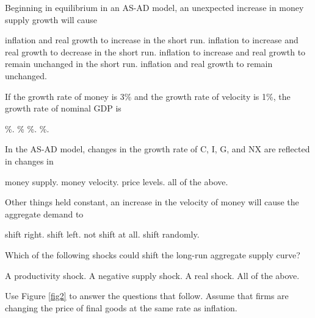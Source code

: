 \documentclass[addpoints,11pt]{exam}
\theoremstyle{definition}
\begin{document}
\begin{questions}
\question  Beginning in equilibrium in an AS-AD model, an unexpected increase in money supply growth will cause

\begin{choices}
	\CorrectChoice inflation and real growth to increase in the short run.
	\choice inflation to increase and real growth to decrease in the short run.
	\choice inflation to increase and real growth to remain unchanged in the short run.
	\choice inflation and real growth to remain unchanged.
\end{choices}

\question If the growth rate of money is 3\% and the growth rate of velocity is 1\%, the growth rate of nominal GDP is 

\begin{choices}
	\%.
	\%
	\%.
	\%.
\end{choices}

\question In the AS-AD model, changes in the growth rate of C, I, G, and NX are reflected in changes in 

\begin{choices}
	\choice money supply.
	\CorrectChoice money velocity.
	\choice price levels.
	\choice all of the above.
\end{choices}

\question Other things held constant, an increase in the velocity of money will cause the aggregate demand to 

\begin{choices}
	\CorrectChoice shift right.
	\choice shift left.
	\choice not shift at all.
	\choice shift randomly.
\end{choices}

\newpage

\question Which of the following shocks could shift the long-run aggregate supply curve?

\begin{choices}
	\choice A productivity shock.
	\choice A negative supply shock.
	\choice A real shock.
	\CorrectChoice All of the above.
\end{choices}

\question Use Figure \ref{fig2} to answer the questions that follow. Assume that firms are changing the price of final goods at the same rate as inflation.



\end{questions}
\end{document}
